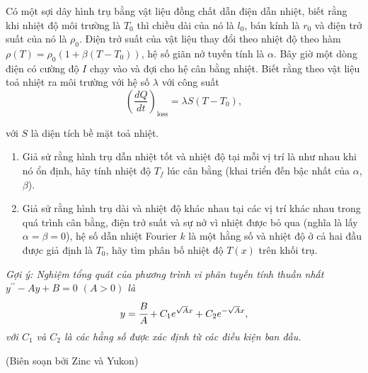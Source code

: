 Có một sợi dây hình trụ bằng vật liệu đồng chất dẫn điện dẫn nhiệt, biết rằng khi nhiệt độ môi trường là $ T_{0} $ thì chiều dài của nó là $ l_{0} $, bán kính là $ r_{0} $ và điện trở suất của nó là $ \rho_{0} $.
Điện trở suất của vật liệu thay đổi theo nhiệt độ theo hàm $ \rho (T) = \rho_{0} \left (1+ \beta \left (T-T_{0} \right) \right) $, hệ số giãn nở tuyến tính là $\alpha$. Bây giờ một dòng điện có cường độ $ I $ chạy vào và đợi cho hệ cân bằng nhiệt. Biết rằng theo vật liệu toả nhiệt ra môi trường với hệ số $\lambda$ với công suất
$$\left(\frac{dQ}{dt}\right)_{\text{loss}} = \lambda S (T - T_0),$$




\begin{minipage}{0.76\textwidth}
với $S$ là diện tích bề mặt toả nhiệt.

\begin{enumerate}[label=\textbf{\alph*,}]\itemsep0em
\item Giả sử rằng hình trụ dẫn nhiệt tốt và nhiệt độ tại mỗi vị trí là như nhau khi nó ổn định, hãy tính nhiệt độ $ T_{f} $ lúc cân bằng (khai triển đến bậc nhất của $\alpha$, $\beta$).
\item Giả sử rằng hình trụ dài và nhiệt độ khác nhau tại các vị trí khác nhau trong quá trình cân bằng, điện trở suất và sự nở vì nhiệt được bỏ qua (nghĩa là lấy $ \alpha = \beta = 0 $), hệ số dẫn nhiệt Fourier $ k $ là một hằng số và nhiệt độ ở cả hai đầu được giả định là $ T_{0} $, hãy tìm phân bố nhiệt độ $ T (x) $ trên khối trụ. 
\end{enumerate}
\end{minipage}
\begin{minipage}{0.35\textwidth}
\quad \quad
\end{minipage}

\vspace{1.5mm}
\textit{Gợi ý: Nghiệm tổng quát của phương trình vi phân tuyến tính thuần nhất $ y ^{\prime \prime} -A y + B = 0$ $(A> 0) $ là} 
$$ y = \cfrac{B}{A} + C_{1} e ^{ \sqrt{A} x} + C_{2} e ^{- \sqrt{A} x} ,$$
\textit{với $C_1$ và $C_2$ là các hằng số được xác định từ các điều kiện ban đầu.}

\begin{flushright}
    (Biên soạn bởi Zinc và Yukon)
\end{flushright}